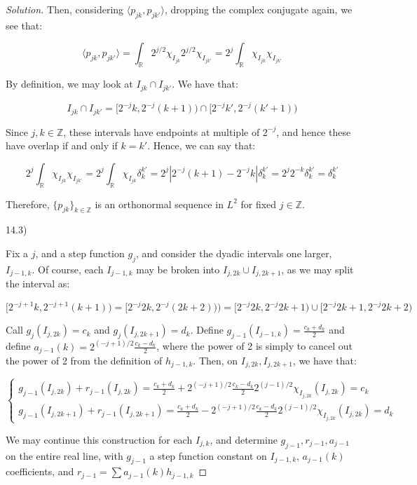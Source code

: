 \documentclass[10pt]{article}
\begin{document}
\begin{proof}[Solution]
Then, considering $\langle p_{jk}, p_{jk'} \rangle$, dropping the complex conjugate again, we see that:

$$ \langle p_{jk}, p_{jk'} \rangle = \int_{\mathbb{R}} 2^{j/2}  \chi_{I_{jk}} 2^{j/2}  \chi_{I_{jk'}} = 2^{j} \int_\mathbb{R}  \chi_{I_{jk}}  \chi_{I_{jk'}}$$

By definition, we may look at $I_{jk} \cap I_{jk'}$. We have that:

$$ I_{jk} \cap I_{jk'} =  [2^{-j}k, 2^{-j}(k+1)) \cap  [2^{-j}k', 2^{-j}(k'+1))$$

Since $j, k \in \mathbb{Z}$, these intervals have endpoints at multiple of $2^{-j}$, and hence these have overlap if and only if $k = k'$. Hence, we can say that:

$$ 2^{j} \int_\mathbb{R}  \chi_{I_{jk}}  \chi_{I_{jk'}} = 2^{j} \int_\mathbb{R}  \chi_{I_{jk}}  \delta_k^{k'} = 2^j | 2^{-j}(k+1) - 2^{-j} k| \delta_k^{k'} = 2^j 2^{-k} \delta_k^{k'} = \delta_k^{k'} $$

Therefore, $\{ p_{jk} \}_{k \in \mathbb{Z}}$ is an orthonormal sequence in $L^2$ for fixed $j \in \mathbb{Z}$.

14.3)

Fix a $j$, and a step function $g_j$, and consider the dyadic intervals one larger, $I_{j-1, k}$. Of course, each $I_{j-1,k}$ may be broken into $I_{j,2k} \cup I_{j, 2k+1}$, as we may split the interval as:

$$[2^{-j+1}k, 2^{-j+1}(k+1)) = [2^{-j} 2k, 2^{-j}(2k+2))) = [ 2^{-j} 2k, 2^{-j} 2k + 1) \cup [ 2^{-j} 2k+1, 2^{-j} 2k+2) $$

Call $g_j(I_{j, 2k}) = c_k$ and $g_j(I_{j, 2k+1}) = d_k$. Define $g_{j-1}(I_{j-1, k}) = \frac{c_k+d_k}{2}$ and define $a_{j-1}(k) = 2^{(-j+1)/2} \frac{c_k - d_k}{2}$, where the power of 2 is simply to cancel out the power of 2 from the definition of $h_{j-1, k}$. Then, on $I_{j, 2k},I_{j, 2k+1} $, we have that:

$$ \begin{cases} g_{j-1}(I_{j, 2k}) + r_{j-1}(I_{j, 2k}) = \frac{c_k + d_k}{2} +  2^{(-j+1)/2}\frac{c_k - d_k}{2} 2^{(j-1)/2}\chi_{I_{j, 2k}}(I_{j, 2k}) = c_k \\ g_{j-1}(I_{j, 2k+1}) + r_{j-1}(I_{j, 2k+1}) = \frac{c_k + d_k}{2} -  2^{(-j+1)/2}\frac{c_k - d_k}{2} 2^{(j-1)/2} \chi_{I_{j, 2k}}(I_{j, 2k}) = d_k \end{cases} $$

We may continue this construction for each $I_{j, k}$, and determine $g_{j-1}, r_{j-1}, a_{j-1}$ on the entire real line, with $g_{j-1}$ a step function constant on $I_{j-1, k}$, $a_{j-1}(k)$ coefficients, and $r_{j-1} = \sum a_{j-1}(k) h_{j-1, k} $


\end{proof}
\end{document}
